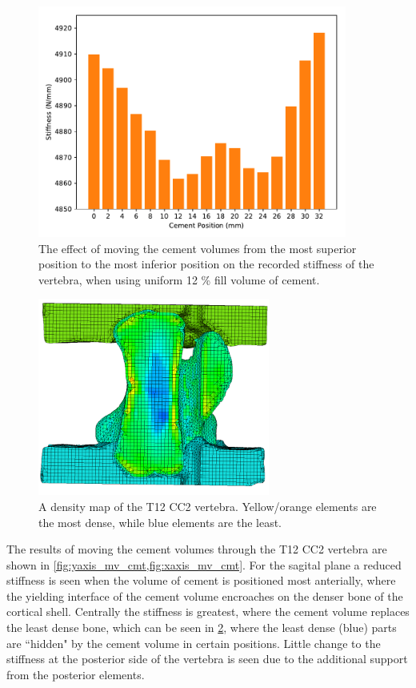 \begin{figure}[ht!]

\centering
\includegraphics[width=4in]{images/yaxis_mv_cmt.pdf}
\caption{The effect of moving the cement volumes from the most superior position to the most inferior position on the recorded stiffness of the vertebra, when using uniform 12 \% fill volume of cement. }
	\label{fig:yaxis_mv_cmt}
\end{figure}

\begin{figure}[ht!]

\centering
\includegraphics[width=3in]{images/mv_cmt_image.png}
	\caption{A density map of the T12 CC2 vertebra. Yellow/orange elements are the most dense, while blue elements are the least. }
	\label{fig:mv_cmt_image}
\end{figure}

The results of moving the cement volumes through the T12 CC2 vertebra are shown
in \cref{fig:yaxis_mv_cmt,fig:xaxis_mv_cmt}.  For the sagital plane a reduced
stiffness is seen when the volume of cement is positioned most anterially,
where the yielding interface of the cement volume encroaches on the denser bone
of the cortical shell.  Centrally the stiffness is greatest, where the cement
volume replaces the least dense bone, which can be seen in
\cref{fig:mv_cmt_image}, where the least dense (blue) parts are ``hidden" by
the cement volume in certain positions.  Little change to the stiffness at the
posterior side of the vertebra is seen due to the additional support from the
posterior elements.

